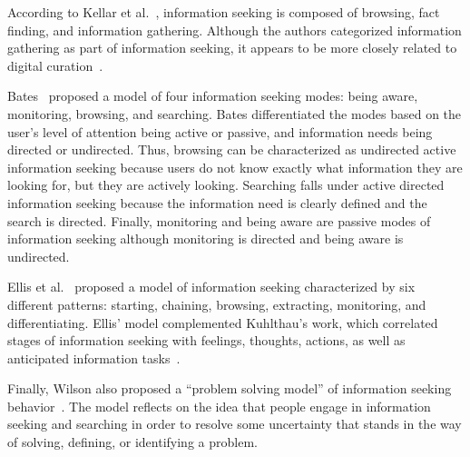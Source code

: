 {{According to Kellar et al.~\cite{kellar2006goal}, information seeking is composed of browsing, fact finding, and information gathering. Although the authors categorized information gathering as part of information seeking, it appears to be more closely related to digital curation~\cite{beagrie2008digital,whittaker2011personal}. 

Bates~\cite{bates1986exploratory,bates2002toward} proposed a model of four information seeking modes: being aware, monitoring, browsing, and searching. Bates differentiated the modes based on the user's level of attention being active or passive, and information needs being directed or undirected. Thus, browsing can be characterized as undirected active information seeking because users do not know exactly what information they are looking for, but they are actively looking. Searching falls under active directed information seeking because the information need is clearly defined and the search is directed. Finally, monitoring and being aware are passive modes of information seeking although monitoring is directed and being aware is undirected.

Ellis et al.~\cite{ellis1989behavioural,ellis1993comparison,ellis1997modelling} proposed a model of information seeking characterized by six different patterns: starting, chaining, browsing, extracting, monitoring, and differentiating. Ellis' model complemented Kuhlthau's work, which correlated stages of information seeking with feelings, thoughts, actions, as well as anticipated information tasks~\cite{kuhlthau1991inside}.

Finally, Wilson also proposed a ``problem solving model'' of information seeking behavior~\cite{wilson1999models}. The model reflects on the idea that people engage in information seeking and searching in order to resolve some uncertainty that stands in the way of solving, defining, or identifying a problem.  
} %

}
